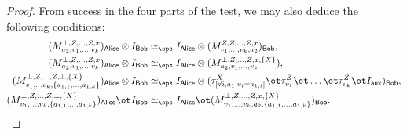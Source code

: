 \documentclass[11pt]{article}
\newcommand{\reg}[1]{{\mathsf{#1}}}
\begin{document}
\begin{proof}
    
    From success in the four parts of the test, we may also deduce the
    following conditions:
    \begin{align*}
      (M^{\bot, Z, \dots ,Z, x}_{a_2, v_1, \dots, v_k})_{\reg{Alice}} \otimes I_{\reg{Bob}} &\simeq_{\eps}
                                       I_{\reg{Alice}} \otimes (M^{Z,Z, \dots, Z, x}_{v_1,
                             \dots, v_k, 
                                a_2})_{\reg{Bob}}, \\
      (M^{\bot, Z,\dots, Z, x}_{a_2, v_1, \dots, v_k})_{\reg{Alice}} \otimes I_{\reg{Bob}} &\simeq_{\eps} 
 	                     I_{\reg{Alice}} \otimes (M^{\bot,Z ,\dots, Z,  x, \{X\}}_{a_2, v_1,
                             \dots, v_k}), \\
      (M^{\bot, Z,\dots, Z,  \bot, \{X\}}_{v_1, \dots v_k, \{a_{1,1}, \dots,
                                                                    a_{1, k}\}})_{\reg{Alice}} \otimes I_{\reg{Bob}} &\simeq_{\eps}
      			I_{\reg{Alice}} \otimes (\tau^X_{[\forall i, a_1 \cdot v_i = a_{1, i}]} \ot \tau^{Z}_{v_1} \ot \dots \ot \tau^{Z}_{v_k} \ot
                                                                                                                       I_{\reg{aux}})_{\reg{Bob}}, \\
      (M^{\bot, Z, \dots, Z, \bot, \{X\}}_{v_1, \dots, v_k, \{a_{1,1},
      \dots, a_{1,k}\}})_{\reg{Alice}} \ot I_{\reg{Bob}}
                                                                                            &\simeq_{\eps}
                                                                                              I_{\reg{Alice}}
                                                                                              \ot
                                                                                              (M^{\bot,
                                                                                              Z,
                                                                                              \dots,
                                                                                              Z,
                                                                                              x,
                                                                                              \{X\}}_{v_1,
                                                                                              \dots,
                                                                                              v_k, a_2,
                                                                                              \{a_{1,1},
                                                                                              \dots,
                                                                                              a_{1,k}\}} )_{\reg{Bob}}.
    \end{align*}
    

\end{proof}
\end{document}
